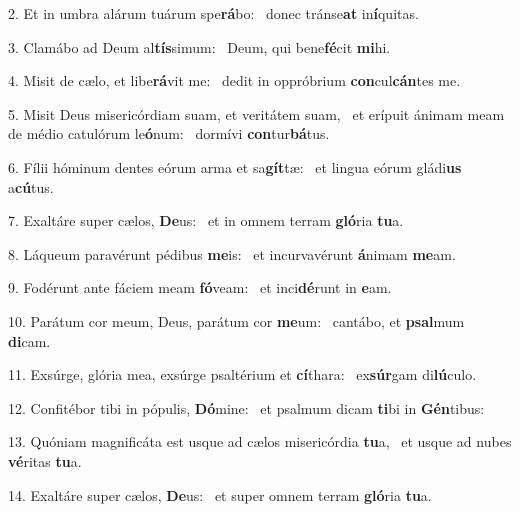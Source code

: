 2. Et in umbra alárum tuárum spe\textbf{rá}bo: \ast\  donec tránse\textbf{at} in\textbf{í}quitas.\

3. Clamábo ad Deum al\textbf{tís}simum: \ast\  Deum, qui bene\textbf{fé}cit \textbf{mi}hi.\

4. Misit de cælo, et libe\textbf{rá}vit me: \ast\  dedit in oppróbrium \textbf{con}cul\textbf{cán}tes me.\

5. Misit Deus misericórdiam suam, et veritátem suam, \dag\  et erípuit ánimam meam de médio catulórum le\textbf{ó}num: \ast\  dormívi \textbf{con}tur\textbf{bá}tus.\

6. Fílii hóminum dentes eórum arma et sa\textbf{gít}tæ: \ast\  et lingua eórum gládi\textbf{us} a\textbf{cú}tus.\

7. Exaltáre super cælos, \textbf{De}us: \ast\  et in omnem terram \textbf{gló}ria \textbf{tu}a.\

8. Láqueum paravérunt pédibus \textbf{me}is: \ast\  et incurvavérunt \textbf{á}nimam \textbf{me}am.\

9. Fodérunt ante fáciem meam \textbf{fó}veam: \ast\  et inci\textbf{dé}runt in \textbf{e}am.\

10. Parátum cor meum, Deus, parátum cor \textbf{me}um: \ast\  cantábo, et \textbf{psal}mum \textbf{di}cam.\

11. Exsúrge, glória mea, exsúrge psaltérium et \textbf{cí}thara: \ast\  ex\textbf{súr}gam di\textbf{lú}culo.\

12. Confitébor tibi in pópulis, \textbf{Dó}mine: \ast\  et psalmum dicam \textbf{ti}bi in \textbf{Gén}tibus:\

13. Quóniam magnificáta est usque ad cælos misericórdia \textbf{tu}a, \ast\  et usque ad nubes \textbf{vé}ritas \textbf{tu}a.\

14. Exaltáre super cælos, \textbf{De}us: \ast\  et super omnem terram \textbf{gló}ria \textbf{tu}a.\


